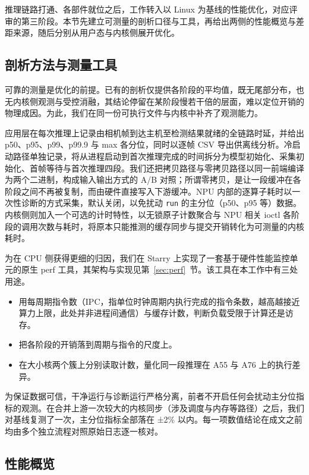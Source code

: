 \documentclass[11pt,a4paper]{ctexart}
\begin{document}
推理链路打通、各部件就位之后，工作转入以 Linux 为基线的性能优化，对应评审的第三阶段。本节先建立可测量的剖析口径与工具，再给出两侧的性能概览与差距来源，随后分别从用户态与内核侧展开优化。

\subsection{剖析方法与测量工具}\label{sec:profiling}

可靠的测量是优化的前提。已有的剖析仅提供各阶段的平均值，既无尾部分布，也无内核侧观测与受控消融，其结论停留在某阶段慢若干倍的层面，难以定位开销的物理成因。为此，我们在同一份可执行文件与内核中补齐了观测能力。

应用层在每次推理上记录由相机帧到达主机至检测结果就绪的全链路时延，并给出 p50、p95、p99、p99.9 与 max 各分位，同时以逐帧 CSV 导出供离线分析。冷启动路径单独记录，将从进程启动到首次推理完成的时间拆分为模型初始化、采集初始化、首帧等待与首次推理四段。我们还把拷贝路径与零拷贝路径以同一前端编译为两个二进制，构成输入输出方式的 A/B 对照；所谓零拷贝，是让一段缓冲在各阶段之间不再被复制，而由硬件直接写入下游缓冲。NPU 内部的逐算子耗时以一次性诊断的方式采集，默认关闭，以免扰动 \texttt{run} 的主分位（p50、p95 等）数据。内核侧则加入一个可选的计时特性，以无锁原子计数聚合与 NPU 相关 ioctl 各阶段的调用次数与耗时，将原本只能推测的缓存同步与提交开销转化为可测量的内核耗时。

为在 CPU 侧获得更细的归因，我们在 Starry 上实现了一套基于硬件性能监控单元的原生 perf 工具，其架构与实现见第~\ref{sec:perf}~节。该工具在本工作中有三处用途。
\begin{itemize}
\item 用每周期指令数（IPC，指单位时钟周期内执行完成的指令条数，越高越接近算力上限，此处并非进程间通信）与缓存计数，判断负载受限于计算还是访存。
\item 把各阶段的开销落到周期与指令的尺度上。
\item 在大小核两个簇上分别读取计数，量化同一段推理在 A55 与 A76 上的执行差异。
\end{itemize}

为保证数据可信，干净运行与诊断运行严格分离，前者不开启任何会扰动主分位指标的观测。在合并上游一次较大的内核同步（涉及调度与内存等路径）之后，我们对基线复测了一次，主分位指标全部落在 ±2\% 以内。每一项数值结论在成文之前均由多个独立流程对照原始日志逐一核对。

\subsection{性能概览}\label{sec:overview}
\end{document}
